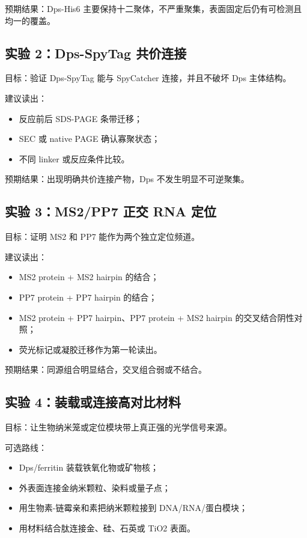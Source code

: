 \documentclass[11pt]{article}
\begin{document}
预期结果：Dps-His6 主要保持十二聚体，不严重聚集，表面固定后仍有可检测且均一的覆盖。

\subsection{实验 2：Dps-SpyTag 共价连接}

目标：验证 Dps-SpyTag 能与 SpyCatcher 连接，并且不破坏 Dps 主体结构。

建议读出：

\begin{itemize}
\item 反应前后 SDS-PAGE 条带迁移；
\item SEC 或 native PAGE 确认寡聚状态；
\item 不同 linker 或反应条件比较。
\end{itemize}

预期结果：出现明确共价连接产物，Dps 不发生明显不可逆聚集。

\subsection{实验 3：MS2/PP7 正交 RNA 定位}

目标：证明 MS2 和 PP7 能作为两个独立定位频道。

建议读出：

\begin{itemize}
\item MS2 protein + MS2 hairpin 的结合；
\item PP7 protein + PP7 hairpin 的结合；
\item MS2 protein + PP7 hairpin、PP7 protein + MS2 hairpin 的交叉结合阴性对照；
\item 荧光标记或凝胶迁移作为第一轮读出。
\end{itemize}

预期结果：同源组合明显结合，交叉组合弱或不结合。

\subsection{实验 4：装载或连接高对比材料}

目标：让生物纳米笼或定位模块带上真正强的光学信号来源。

可选路线：

\begin{itemize}
\item Dps/ferritin 装载铁氧化物或矿物核；
\item 外表面连接金纳米颗粒、染料或量子点；
\item 用生物素-链霉亲和素把纳米颗粒接到 DNA/RNA/蛋白模块；
\item 用材料结合肽连接金、硅、石英或 TiO2 表面。
\end{itemize}
\end{document}

